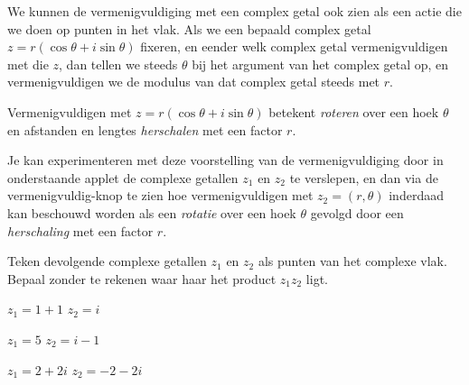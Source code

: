 \documentclass{ximera}
\begin{document}
\begin{xmuitweiding}


We kunnen de vermenigvuldiging met een complex getal ook zien als een actie die we doen op punten in het vlak. Als we een bepaald complex getal $z = r(\cos\theta + i \sin \theta)$ fixeren, en eender welk complex getal vermenigvuldigen met die $z$, dan tellen we steeds $\theta$ bij het argument van het complex getal op, en vermenigvuldigen we de modulus van dat complex getal steeds met $r$.
 
\begin{proposition}[Vermenigvuldiging met een complex getal in goniometrische schrijfwijze $z=r(\cos\theta + i\sin\theta)$]\nl
     
Vermenigvuldigen met $z = r(\cos\theta + i\sin\theta)$ betekent \textit{roteren} over een hoek $\theta$ en afstanden en lengtes \textit{herschalen} met een factor $r$.
\end{proposition}
 
Je kan experimenteren met deze voorstelling van de vermenigvuldiging door in onderstaande applet de complexe getallen $z_1$ en $z_2$ te verslepen, en dan via de vermenigvuldig-knop te zien hoe vermenigvuldigen met $z_2 = (r,\theta)$ inderdaad kan beschouwd worden als een \textit{rotatie} over een hoek $\theta$ gevolgd door een \textit{herschaling} met een factor $r$.
 

\begin{exercise}
    Teken devolgende complexe getallen \(z_1\) en \(z_2\) als punten van het complexe vlak. Bepaal zonder te rekenen waar haar het product \( z_1 z_2\) ligt. 
    \begin{question} \(z_1 = 1+1\) \(z_2 = i\)    \end{question}
    \begin{question} \(z_1 = 5\) \(z_2 = i - 1\)\end{question}
    \begin{question} \(z_1 = 2 + 2i\) \(z_2 = -2 - 2i \) \end{question}
\end{exercise}

\end{xmuitweiding}

\end{document}
